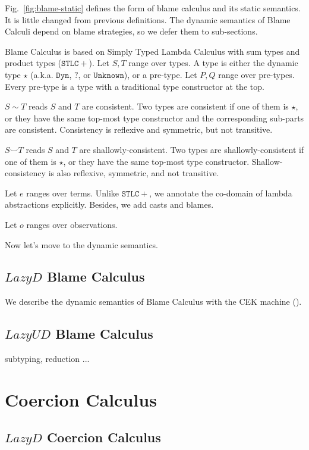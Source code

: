 \documentclass[acmsmall,review,anonymous]{acmart}\settopmatter{printfolios=true,printccs=false,printacmref=false}
\newcommand{\figref}[1]{Fig.~\ref{#1}}
\begin{document}
\figref{fig:blame-static} defines the form of blame calculus and its static 
semantics. It is little changed from previous definitions. 
The dynamic semantics of Blame Calculi depend on blame strategies, so we defer 
them to sub-sections.

Blame Calculus is based on Simply Typed Lambda Calculus with sum types and 
product types ($ \mathtt{STLC+} $). 
Let $ S,T $ range over types. A type is either the dynamic type $ \star $
(a.k.a. $ \mathtt{Dyn} $, $ \mathbb{?} $, or $ \mathtt{Unknown} $), 
or a pre-type. 
Let $ P,Q $ range over pre-types. Every pre-type is a type with a 
traditional type constructor at the top.

$ S \sim T $ reads $ S $ and $ T $ are consistent. Two types are consistent if 
one of them is $ \star $, or they have the same top-most type constructor and 
the corresponding sub-parts are consistent. Consistency is reflexive and 
symmetric, but not transitive.

$ S \smile T $ reads $ S $ and $ T $ are shallowly-consistent. Two types are 
shallowly-consistent if one of them is $ \star $, or they have the same 
top-most type constructor. 
Shallow-consistency is also reflexive, symmetric, and not transitive.

Let $ e $ ranges over terms. Unlike $ \mathtt{STLC+} $, we annotate the 
co-domain of lambda abstractions explicitly. Besides, we add casts and blames.

Let $ o $ ranges over observations.

Now let's move to the dynamic semantics. 

\subsection{$Lazy D$ Blame Calculus}

We describe the dynamic semantics of Blame Calculus with the CEK machine 
(\citet{felleisen1986control}).

\subsection{$Lazy UD$ Blame Calculus}

subtyping, reduction ...

\section{Coercion Calculus}

\subsection{$Lazy D$ Coercion Calculus}
\end{document}
